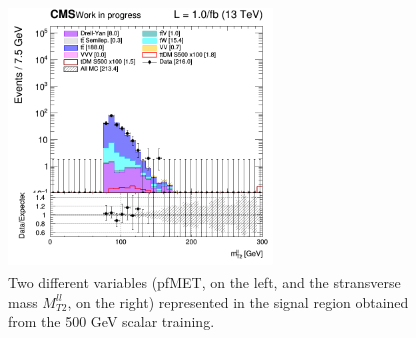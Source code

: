 \documentclass[a4paper, 10pt, openright]{report}
\begin{document}
\begin{figure}[htbp]
{\begin{minipage}[b]{.48\textwidth}
\end{minipage}\hfill
\begin{minipage}[b]{.48\textwidth}
\includegraphics[width=7cm, height=7cm]{figs/2017/SRBlinded-ttDM-scalar500/log_cratio_topCR_ll_BDT_ttDM500_mt2ll.png}
\end{minipage} \hfill
}
\caption{Two different variables (pf\ac{MET}, on the left, and the stransverse mass $M_{T2}^{ll}$, on the right) represented in the signal region obtained from the 500 GeV scalar training.}
\label{fig:SR2}
\end{figure}
\end{document}

